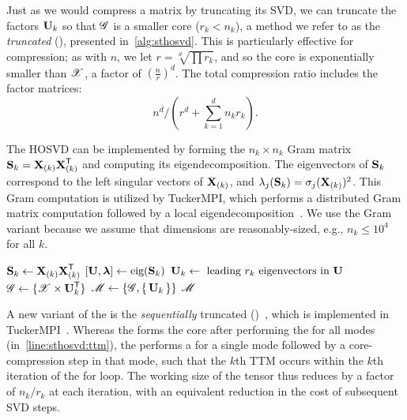 Just as we would compress a matrix by truncating its SVD, we can truncate the factors 
$\Mn{U}{k}$ so that $\T{G}$ is a smaller core ($r_k < n_k$), a method we refer to as the 
\emph{truncated} \hosvd (\thosvd), presented in~\cref{alg:sthosvd}.
This is particularly effective for compression; as with $n$, we let $r=\sqrt[d]{\prod r_k}$, and so 
the core is exponentially smaller than $\T{X}$, a factor of $(\frac{n}{r})^d$. 
The total compression ratio includes the factor matrices:
\begin{equation}
\label{eqn:compression}
n^d / \left(r^d + \sum_{k=1}^d n_k r_k\right).
\end{equation}

The HOSVD can be
implemented by forming the $n_k \times n_k$ Gram matrix $\M{S}_k = \M{X}_{(k)}\M{X}_{(k)}^\trans$ 
and computing its eigendecomposition. The eigenvectors of $\M{S}_k$ correspond to the left
singular vectors of $\M{X}_{(k)}$, and $\lambda_j(\M{S}_k) = \sigma_j(\M{X}_{(k)})^2$. 
This Gram computation is utilized by TuckerMPI, which performs a distributed Gram matrix 
computation followed by a local eigendecomposition~\cite{AuBaKo16}.
We use the Gram variant because we 
assume that dimensions are reasonably-sized, e.g., $n_k \leq 10^4$ for all $k$.

\begin{algorithm}[htb]
  \caption{\thosvd{}}
  \begin{algorithmic}[1]
    \State $\M{S}_k \gets \M{X}_{(k)}\M{X}_{(k)}^\trans $ 
    \State $[\M{U},\M{\lambda}] \gets \text{eig}(\M{S}_k)$ 
    \State \label{line:sthosvd:svd} $\Mn{U}{k} \gets \text{ leading $r_k$ eigenvectors in $\M{U}$}$
    \EndFor
    \State \label{line:sthosvd:trunc} $\T{G} \gets \{ \T{X} \times \Mn{U}{k}^\trans\}$ 
    \State $\T{M} \gets \{ \T{G}, \set{\Mn{U}{k}} \}$ \label{line:sthosvd:ttm}
    \State \Return $\T{M}$
    \EndProcedure
  \end{algorithmic}
  \label{alg:sthosvd}
\end{algorithm}
%
A new variant of the \thosvd is the \emph{sequentially} truncated \hosvd (\sthosvd)~\cite{sthosvd}, 
which is implemented in TuckerMPI~\cite{AuBaKo16}. Whereas the \thosvd forms the core 
after performing the \MTFSBC for all modes (in~\cref{line:sthosvd:ttm}), 
the \sthosvd performs a \MTFSBC for a single mode followed by a core-compression step in that mode,
such that the $k$th TTM occurs within the $k$th iteration of the for loop. 
The working size of the tensor thus reduces by a 
factor of $n_k / r_k$ at each iteration, with an equivalent reduction in the cost of subsequent SVD steps.
%



